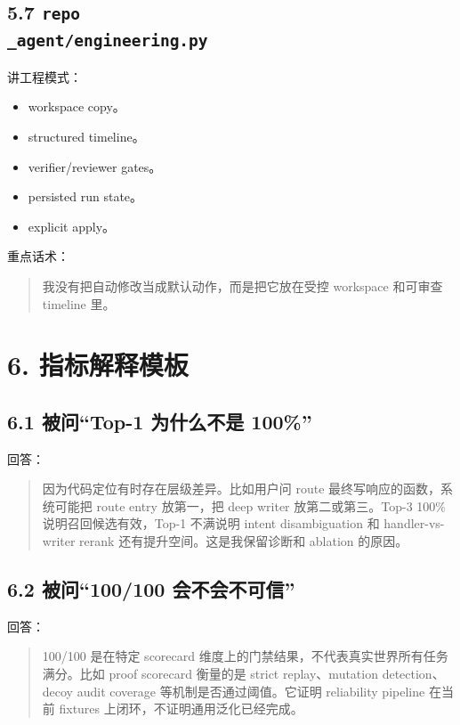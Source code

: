 \documentclass[UTF8,12pt,openany]{ctexbook}
\begin{document}
\subsection{5.7 \texttt{repo\\_agent/engineering.py}}

讲工程模式：\par

\begin{itemize}
\item workspace copy。
\item structured timeline。
\item verifier/reviewer gates。
\item persisted run state。
\item explicit apply。
\end{itemize}

重点话术：\par

\begin{quote}
我没有把自动修改当成默认动作，而是把它放在受控 workspace 和可审查 timeline 里。
\end{quote}

\section{6. 指标解释模板}

\subsection{6.1 被问“Top-1 为什么不是 100\%”}

回答：\par

\begin{quote}
因为代码定位有时存在层级差异。比如用户问 route 最终写响应的函数，系统可能把 route entry 放第一，把 deep writer 放第二或第三。Top-3 100\% 说明召回候选有效，Top-1 不满说明 intent disambiguation 和 handler-vs-writer rerank 还有提升空间。这是我保留诊断和 ablation 的原因。
\end{quote}

\subsection{6.2 被问“100/100 会不会不可信”}

回答：\par

\begin{quote}
100/100 是在特定 scorecard 维度上的门禁结果，不代表真实世界所有任务满分。比如 proof scorecard 衡量的是 strict replay、mutation detection、decoy audit coverage 等机制是否通过阈值。它证明 reliability pipeline 在当前 fixtures 上闭环，不证明通用泛化已经完成。
\end{quote}
\end{document}
